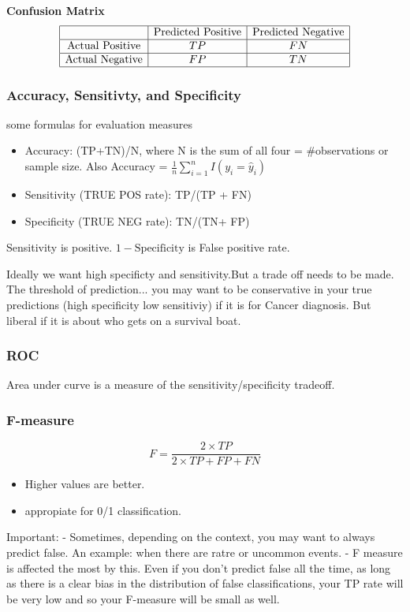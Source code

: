 \documentclass{article}
\begin{document}
\textbf{Confusion Matrix}
\[
\begin{array}{|c|c|c|}
\hline
 & \text{Predicted Positive} & \text{Predicted Negative} \\
\hline
\text{Actual Positive} & TP & FN \\
\hline
\text{Actual Negative} & FP & TN \\
\hline
\end{array}
\]

\subsubsection{Accuracy, Sensitivty, and Specificity}
some formulas for evaluation measures
\begin{itemize}
\item Accuracy: (TP+TN)/N, where N is the sum of all four = \#observations or sample size. Also Accuracy = $\frac{1}{n} \sum_{i=1}^n I(y_i = \hat y_i)$
\item Sensitivity (TRUE POS rate): TP/(TP + FN)
\item Specificity (TRUE NEG rate): TN/(TN+ FP)
\end{itemize}

Sensitivity is positive. 
$1-\text{Specificity}$ is False positive rate. 

Ideally we want high specificty and sensitivity.But a trade off needs to be made. The threshold of prediction... you may want to be conservative in your true predictions (high specificity low sensitiviy) if it is for Cancer diagnosis. But liberal if it is about who gets on a survival boat.

\subsubsection{ROC}
Area under curve is a measure of the sensitivity/specificity tradeoff. 

\subsubsection{F-measure}
\[
F = \frac{2 \times TP}{2 \times TP + FP +FN}
\]

\begin{itemize}
\item Higher values are better. 
\item appropiate for 0/1 classification.
\end{itemize}

Important: 
- Sometimes, depending on the context, you may want to always predict false. An example: when there are ratre or uncommon events. 
- F measure is affected the most by this. Even if you don't predict false all the time, as long as there is a clear bias in the distribution of false classifications, your TP rate will be very low and so your F-measure will be small as well. 
\end{document}
